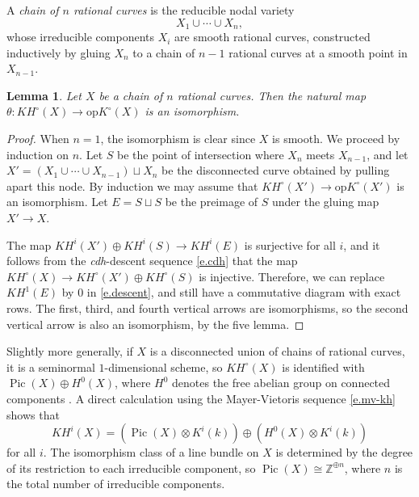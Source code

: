 \documentclass[11pt]{amsart}
\newtheorem{lemma}[theorem]{Lemma}
\theoremstyle{definition}
\begin{document}
A {\em chain of $n$ rational curves} is the reducible nodal variety
\[
X_1 \cup \cdots \cup X_n,
\]
whose irreducible components $X_i$ are smooth rational curves, constructed inductively by gluing $X_n$ to a chain of $n-1$ rational curves at a smooth point in $X_{n-1}$.

\begin{lemma}\label{l.curve-kh-opk}
Let $X$ be a chain of $n$ rational curves.  Then the natural map $\theta\colon KH^\circ(X) \to {\mathrm{op}K}^\circ(X)$ is an isomorphism.
\end{lemma}

\begin{proof}
When $n=1$, the isomorphism is clear since $X$ is smooth. We proceed by induction on $n$.  Let $S$ be the point of intersection where $X_n$ meets $X_{n-1}$, and let $X' = (X_1 \cup \cdots \cup X_{n-1}) \sqcup X_n$ be the disconnected curve obtained by pulling apart this node.     By induction we may assume that $KH^\circ(X') \rightarrow {\mathrm{op}K}^\circ(X')$ is an isomorphism.  Let $E = S \sqcup S$ be the preimage of $S$ under the gluing map $X' \rightarrow X$.

The map $KH^i(X') \oplus KH^i(S) \to KH^i(E)$ is surjective for all $i$, and it follows from the {\em cdh}-descent sequence \eqref{e.cdh} that the map $KH^\circ(X) \to KH^\circ(X') \oplus KH^\circ(S)$ is injective.  
Therefore, we can replace $KH^1(E)$ by $0$ in \eqref{e.descent}, and still have a commutative diagram with exact rows.  The first, third, and fourth vertical arrows are isomorphisms, so the second vertical arrow is also an isomorphism, by the five lemma.
\end{proof}

Slightly more generally, if $X$ is a disconnected union of chains of rational curves, it is a seminormal $1$-dimensional scheme, so $KH^\circ(X)$ is identified with $\operatorname{Pic}(X) \oplus H^0(X)$, where $H^0$ denotes the free abelian group on connected components \cite[IV.12.5.2]{weibel}.  A direct calculation using the Mayer-Vietoris sequence \eqref{e.mv-kh} shows that 
\begin{equation}\label{e.chain}
KH^i(X) = \left(\operatorname{Pic}(X) \otimes K^i(k)\right) \oplus \left(H^0(X) \otimes K^i(k)\right)
\end{equation}
for all $i$.  The isomorphism class of a line bundle on $X$ is determined by the degree of its restriction to each irreducible component, so $\operatorname{Pic}(X) {\cong} {\mathbb{Z}}^{\oplus n}$, where $n$ is the total number of irreducible components.
\end{document}
